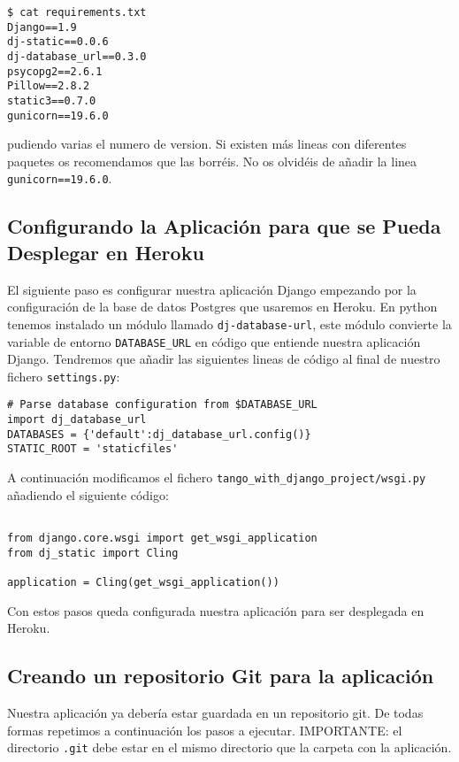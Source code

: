 \documentclass[12pt]{article} %
\begin{document}
\begin{verbatim}
$ cat requirements.txt 
Django==1.9
dj-static==0.0.6
dj-database_url==0.3.0
psycopg2==2.6.1
Pillow==2.8.2
static3==0.7.0
gunicorn==19.6.0
\end{verbatim}

pudiendo varias el numero de version. Si existen más lineas con diferentes paquetes os recomendamos que las borréis. No os olvidéis de añadir la linea \texttt{gunicorn==19.6.0}.

\subsection{Configurando la Aplicación para que se Pueda Desplegar en Heroku}
El siguiente paso es configurar nuestra aplicación Django empezando por la configuración de la base de datos Postgres que usaremos en Heroku. En python tenemos instalado un módulo llamado \texttt{dj-database-url}, este módulo convierte la variable de entorno \texttt{DATABASE\_URL} en código que entiende nuestra aplicación Django. Tendremos que añadir las siguientes lineas de código  al final de nuestro fichero \texttt{settings.py}: 

\begin{verbatim}
# Parse database configuration from $DATABASE_URL
import dj_database_url
DATABASES = {'default':dj_database_url.config()}
STATIC_ROOT = 'staticfiles'
\end{verbatim}





 A continuación modificamos el fichero \texttt{tango\_with\_django\_project/wsgi.py} añadiendo el siguiente código:
\begin{verbatim}
 
from django.core.wsgi import get_wsgi_application
from dj_static import Cling
 
application = Cling(get_wsgi_application())
\end{verbatim}

Con estos  pasos queda configurada nuestra aplicación para ser desplegada en Heroku. 

\subsection{Creando un repositorio Git para la aplicación}
Nuestra aplicación ya debería estar guardada en un repositorio git. De todas formas repetimos a continuación los pasos a ejecutar. IMPORTANTE: el directorio \texttt{.git} debe estar en el mismo directorio que la carpeta con la aplicación.
\end{document}
